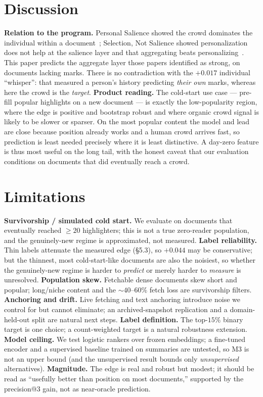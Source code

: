 \documentclass[11pt]{article}
\begin{document}
\section{Discussion}
\textbf{Relation to the program.} Personal Salience showed the crowd dominates the individual
within a document~\cite{nakayashiki2026salience}; Selection, Not Salience showed personalization
does not help at the salience layer and that aggregating beats
personalizing~\cite{nakayashiki2026selection}. This paper predicts the aggregate layer those
papers identified as strong, on documents lacking marks. There is no contradiction with the
$+0.017$ individual ``whisper'': that measured a person's history predicting \emph{their own}
marks, whereas here the crowd is the \emph{target}.
\textbf{Product reading.} The cold-start use case --- pre-fill popular highlights on a new
document --- is exactly the low-popularity region, where the edge is positive and bootstrap
robust and where organic crowd signal is likely to be slower or sparser. On the most popular
content the model and lead are close because position already works and a human crowd arrives
fast, so prediction is least needed precisely where it is least distinctive. A day-zero feature
is thus most useful on the long tail, with the honest caveat that our evaluation conditions on
documents that did eventually reach a crowd.

\section{Limitations}
\textbf{Survivorship / simulated cold start.} We evaluate on documents that eventually reached
$\geq 20$ highlighters; this is not a true zero-reader population, and the genuinely-new regime
is approximated, not measured. \textbf{Label reliability.} Thin labels attenuate the measured
edge (\S5.3), so $+0.044$ may be conservative; but the thinnest, most cold-start-like documents
are also the noisiest, so whether the genuinely-new regime is harder to \emph{predict} or merely
harder to \emph{measure} is unresolved. \textbf{Population skew.} Fetchable dense documents skew
short and popular; long/niche content and the $\sim$$40$--$60\%$ fetch loss are survivorship
filters. \textbf{Anchoring and drift.} Live fetching and text anchoring introduce noise we
control for but cannot eliminate; an archived-snapshot replication and a domain-held-out split are
natural next steps. \textbf{Label definition.} The top-$15\%$ binary target is one choice; a
count-weighted target is a natural robustness extension. \textbf{Model ceiling.} We test logistic
rankers over frozen embeddings; a fine-tuned encoder and a supervised baseline trained on
summaries are untested, so M3 is not an upper bound (and the unsupervised result bounds only
\emph{unsupervised} alternatives). \textbf{Magnitude.} The edge is real and robust but modest; it
should be read as ``usefully better than position on most documents,'' supported by the
precision@3 gain, not as near-oracle prediction.
\end{document}
